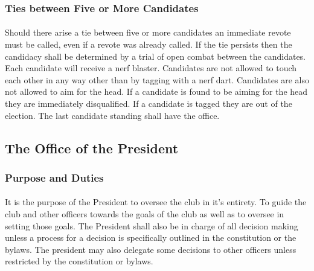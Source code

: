 \documentclass[12pt]{article}
\begin{document}
\subsubsection{Ties between Five or More Candidates}
\paragraph{}
Should there arise a tie between five or more candidates an immediate revote must be called, even if a revote was already called. 
If the tie persists then the candidacy shall be determined by a trial of open combat between the candidates. 
Each candidate will receive a nerf blaster. 
Candidates are not allowed to touch each other in any way other than by tagging with a nerf dart.
Candidates are also not allowed to aim for the head. If a candidate is found to be aiming for the
head they are immediately disqualified. 
If a candidate is tagged they are out of the election. The last candidate standing shall have the office.




\subsection{The Office of the President}
\subsubsection{Purpose and Duties}
\paragraph{}
It is the purpose of the President to oversee the club in it's entirety. To guide the club and other officers towards the goals of the club as well as to oversee in setting those goals. The President shall
also be in charge of all decision making unless a process for a decision is specifically outlined in the constitution or the bylaws. The president may also delegate some decisions to other officers unless
restricted by the constitution or bylaws.
\end{document}
